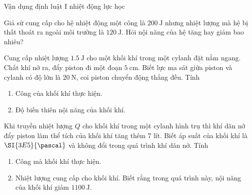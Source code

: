 \begin{dang}{Vận dụng định luật I nhiệt động lực học}
	{Giả sử cung cấp cho hệ nhiệt động một công là $\SI{200}{\joule}$ nhưng nhiệt lượng mà hệ bị thất thoát ra ngoài môi trường là $\SI{120}{\joule}$. Hỏi nội năng của hệ tăng hay giảm bao nhiêu?
	
}
{
}

{Cung cấp nhiệt lượng $\SI{1.5}{\joule}$ cho một khối khí trong một cylanh đặt nằm ngang. Chất khí nở ra, đẩy piston đi một đoạn $\SI{5}{\centi\meter}$. Biết lực ma sát giữa piston và cylanh có độ lớn là $\SI{20}{\newton}$, coi piston chuyển động thẳng đều. Tính
	\begin{enumerate}[label=\alph*)]
		\item Công của khối khí thực hiện.
		\item Độ biến thiên nội năng của khối khí.
	\end{enumerate}

}
{
}

{Khi truyền nhiệt lượng $Q$ cho khối khí trong một cylanh hình trụ thì khí dãn nở đẩy piston làm thể tích của khối khí tăng thêm 7 lít. Biết áp suất của khối khí là $\SI{3E5}{\pascal}$ và không đổi trong quá trình khí dãn nở. Tính
	\begin{enumerate}[label=\alph*)]
		\item Công mà khối khí thực hiện.
		\item Nhiệt lượng cung cấp cho khối khí. Biết rằng trong quá trình này, nội năng của khối khí giảm $\SI{1100}{\joule}$.
	\end{enumerate}

}
\end{dang}
